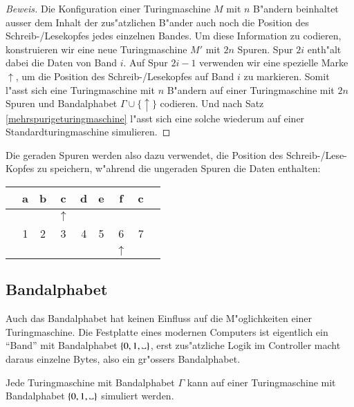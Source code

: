 \begin{proof}[Beweis]
Die Konfiguration einer Turingmaschine $M$ mit $n$ B"andern beinhaltet
ausser dem Inhalt der zus"atzlichen B"ander auch noch die Position
des Schreib-/Lesekopfes jedes einzelnen Bandes. Um diese Information
zu codieren, konstruieren wir eine neue Turingmaschine $M'$ mit
$2n$ Spuren. Spur $2i$ enth"alt dabei die Daten von Band $i$.
Auf Spur $2i-1$ verwenden wir eine spezielle Marke $\uparrow$, um die Position
des Schreib-/Lesekopfes auf Band $i$ zu markieren. Somit l"asst sich
eine Turingmaschine mit $n$ B"andern auf einer Turingmaschine mit
$2n$ Spuren und Bandalphabet $\Gamma\cup\{\uparrow\}$ codieren.
Und nach Satz \ref{mehrspurigeturingmaschine} l"asst sich eine solche wiederum
auf einer Standardturingmaschine simulieren.
\end{proof}
Die geraden Spuren werden also dazu verwendet, die Position des
Schreib-/Lese-Kopfes zu speichern, w"ahrend die ungeraden Spuren
die Daten enthalten:
\begin{center}
\begin{tabular}{c|c|c|c|c|c|c|c|c}
\hline
&a&b&c&d&e&f&c&\\
\hline
& & &$\uparrow$& & & & &\\
\hline
&1&2&3&4&5&6&7&\\
\hline
& & & & & &$\uparrow$& &\\
\hline
\end{tabular}
\end{center}

\subsection{Bandalphabet}
Auch das Bandalphabet hat keinen Einfluss auf die M"oglichkeiten einer
Turingmaschine. Die Festplatte eines modernen Computers ist eigentlich
ein ``Band'' mit Bandalphabet $\{0,1,\blank\}$, erst zus"atzliche
Logik im Controller macht daraus einzelne Bytes, also ein gr"ossers
Bandalphabet.

\begin{satz}
Jede Turingmaschine mit Bandalphabet $\Gamma$ kann auf einer Turingmaschine
mit Bandalphabet $\{0,1,\blank\}$ simuliert werden.
\end{satz}


